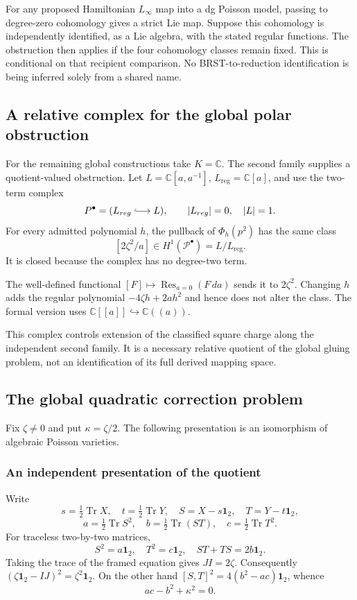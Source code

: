 For any proposed Hamiltonian $L_\infty$ map into a dg Poisson model,
passing to degree-zero cohomology gives a strict Lie map. Suppose this cohomology is independently identified, as a Lie algebra,
with the stated regular functions. The obstruction then applies if
the four cohomology classes remain fixed. This is conditional on
that recipient comparison. No BRST-to-reduction identification is
being inferred solely from a shared name.

\subsection{A relative complex for the global polar obstruction}
For the remaining global constructions take $K=\mathbb C$.
The second family supplies a quotient-valued obstruction.
Let $L=\mathbb C[a,a^{-1}]$, $L_{\mathrm{reg}}=\mathbb C[a]$,
and use the two-term complex
\[
 \mathcal P^\bullet=(L_{\mathrm{reg}}\lhook\joinrel\longrightarrow L),
 \qquad |L_{\mathrm{reg}}|=0,\quad |L|=1.
\]
For every admitted polynomial $h$, the pullback of $\Phi_h(p^2)$
has the same class
\[
 [2\zeta^2/a]\in H^1(\mathcal P^\bullet)=L/L_{\mathrm{reg}}.
\]
It is closed because the complex has no degree-two term.

The well-defined functional
$[F]\mapsto\operatorname{Res}_{a=0}(F\,da)$ sends it to
$2\zeta^2$. Changing $h$ adds the regular polynomial
$-4\zeta h+2ah^2$ and hence does not alter the class. The formal
version uses $\mathbb C[[a]]\hookrightarrow\mathbb C((a))$.

This complex controls extension of the classified square charge
along the independent second family. It is a necessary relative
quotient of the global gluing problem, not an identification of its
full derived mapping space.
\subsection{The global quadratic correction problem}
\label{mht:frgl:sec:global-carrier}

Fix $\zeta\ne0$ and put $\kappa=\zeta/2$. The following presentation
is an isomorphism of algebraic Poisson varieties.

\subsubsection{An independent presentation of the quotient}

Write
\[
 s=\tfrac12\operatorname{Tr}X,\quad
 t=\tfrac12\operatorname{Tr}Y,\quad
 S=X-s\mathbf1_2,\quad T=Y-t\mathbf1_2,
\]
\[
 a=\tfrac12\operatorname{Tr}S^2,\quad
 b=\tfrac12\operatorname{Tr}(ST),\quad
 c=\tfrac12\operatorname{Tr}T^2.
\]
For traceless two-by-two matrices,
\[
 S^2=a\mathbf1_2,\quad T^2=c\mathbf1_2,\quad
 ST+TS=2b\mathbf1_2.
\]
Taking the trace of the framed equation gives $JI=2\zeta$.
Consequently $(\zeta\mathbf1_2-IJ)^2=\zeta^2\mathbf1_2$.
On the other hand $[S,T]^2=4(b^2-ac)\mathbf1_2$, whence
\[
 ac-b^2+\kappa^2=0.
\]

